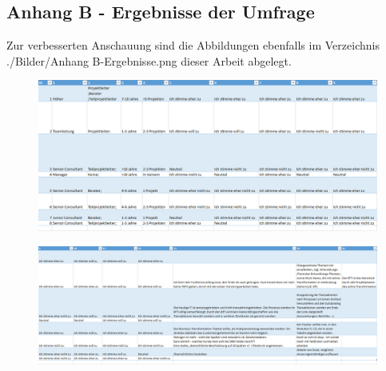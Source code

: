 \subsection*{Anhang B - Ergebnisse der Umfrage}
Zur verbesserten Anschauung sind die Abbildungen ebenfalls im Verzeichnis ./Bilder/Anhang B-Ergebnisse.png dieser Arbeit abgelegt.
\begin{figure}[h!]
    \centering
    \includegraphics[angle=-90, scale=0.65]{./Bilder/Anhang B-Ergebnisse.png}
\end{figure}
\newpage
\begin{figure}[h!]
    \centering
    \includegraphics[angle=-90, scale=0.6]{./Bilder/Anhang B-Ergebnisse2.png}
\end{figure}
\newpage